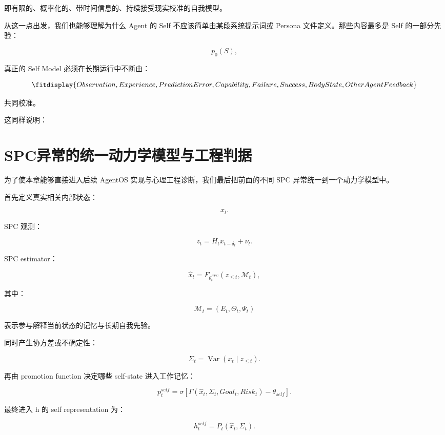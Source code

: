 即有限的、概率化的、带时间信息的、持续接受现实校准的自我模型。

从这一点出发，我们也能够理解为什么 Agent 的 Self 不应该简单由某段系统提示词或 Persona 文件定义。那些内容最多是 Self 的一部分先验：

\[
p_0(S),
\]

真正的 Self Model 必须在长期运行中不断由：

\[
\fitdisplay{
Observation,
Experience,
PredictionError,
Capability,
Failure,
Success,
BodyState,
OtherAgentFeedback
}
\]

共同校准。

这同样说明：

\begin{statementbox}
\centering
{}
\end{statementbox}

\section{SPC异常的统一动力学模型与工程判据}

为了使本章能够直接进入后续 AgentOS 实现与心理工程诊断，我们最后把前面的不同 SPC 异常统一到一个动力学模型中。

首先定义真实相关内部状态：

\[
x_t.
\]

SPC 观测：

\[
z_t
=
H_tx_{t-\delta_t}
+
\nu_t.
\]

SPC estimator：

\[
\hat{x}_t
=
F_{\theta_t^{SPC}}
\left(
z_{\leq t},
\mathcal M_t
\right),
\]

其中：

\[
\mathcal M_t
=
(E_t,\Theta_t,\Psi_t)
\]

表示参与解释当前状态的记忆与长期自我先验。

同时产生协方差或不确定性：

\[
\Sigma_t
=
\operatorname{Var}
\left(
x_t
\mid
z_{\leq t}
\right).
\]

再由 promotion function 决定哪些 self-state 进入工作记忆：

\[
p_t^{self}
=
\sigma
\left[
\Gamma
(
\hat{x}_t,
\Sigma_t,
Goal_t,
Risk_t
)
-
\theta_{self}
\right].
\]

最终进入 h 的 self representation 为：

\[
h_t^{self}
=
P_t
\left(
\hat{x}_t,\Sigma_t
\right).
\]

